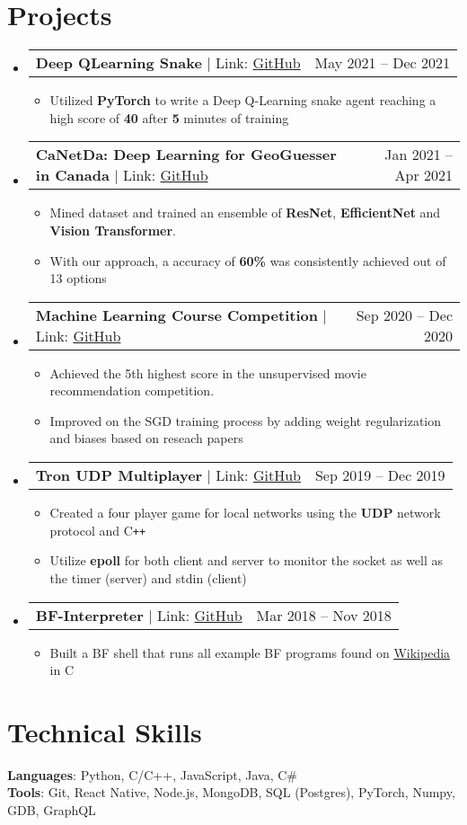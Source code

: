 \documentclass[letterpaper,11pt]{article}
\makeatletter
\newcommand{\resumeItem}[1]{
  \item\small{
    {#1 \vspace{-2pt}}
  }
}
\newcommand{\resumeProjectHeading}[2]{
    \item
    \begin{tabular*}{0.97\textwidth}{l@{\extracolsep{\fill}}r}
      \small#1 & #2 \\
    \end{tabular*}\vspace{-7pt}
}
\newcommand{\resumeSubHeadingListStart}{\begin{itemize}[leftmargin=0.15in, label={}]}
\newcommand{\resumeSubHeadingListEnd}{\end{itemize}}
\newcommand{\resumeItemListStart}{\begin{itemize}}
\newcommand{\resumeItemListEnd}{\end{itemize}\vspace{-7pt}}
\makeatother
\begin{document}
\section{Projects}
    \resumeSubHeadingListStart
      \resumeProjectHeading
        {\textbf{Deep QLearning Snake} $|$ Link: \href{https://github.com/JaLnYn/pokerbot}{GitHub}}{May 2021 -- Dec 2021}
        \resumeItemListStart
          \resumeItem{Utilized \textbf{PyTorch} to write a Deep Q-Learning snake agent reaching a high score of \textbf{40} after \textbf{5} minutes of training}
        \resumeItemListEnd
        \resumeProjectHeading
          {\textbf{CaNetDa: Deep Learning for GeoGuesser in Canada} $|$ Link: \href{https://github.com/st-tran/CSC413-Project}{GitHub}}{Jan 2021 -- Apr 2021}
          \resumeItemListStart
            \resumeItem{Mined dataset and trained an ensemble of \textbf{ResNet}, \textbf{EfficientNet} and \textbf{Vision Transformer}.}
            \resumeItem{With our approach, a accuracy of \textbf{60\%} was consistently achieved out of 13 options}
          \resumeItemListEnd
      \resumeProjectHeading
          {\textbf{Machine Learning Course Competition} $|$ Link: \href{https://github.com/JaLnYn/csc311_final_project/tree/main/project/starter_code}{GitHub}}{Sep 2020 -- Dec 2020}
          \resumeItemListStart
            \resumeItem{Achieved the 5th highest score in the unsupervised movie recommendation competition.}
            \resumeItem{Improved on the SGD training process by adding weight regularization and biases based on reseach papers}
          \resumeItemListEnd
      \resumeProjectHeading
        {\textbf{Tron UDP Multiplayer} $|$ Link: \href{https://github.com/JaLnYn/Tron}{GitHub}}{Sep 2019 -- Dec 2019}
        \resumeItemListStart
          \resumeItem{Created a four player game for local networks using the \textbf{UDP} network protocol and C\texttt{++}}
          \resumeItem{Utilize \textbf{epoll} for both client and server to monitor the socket as well as the timer (server) and stdin (client)}
        \resumeItemListEnd
      \resumeProjectHeading
        {\textbf{BF-Interpreter} $|$ Link: \href{https://github.com/JaLnYn/Bf-interpreter}{GitHub}}{Mar 2018 -- Nov 2018}
        \resumeItemListStart
          \resumeItem{Built a BF shell that runs all example BF programs found on \href{https://en.wikipedia.org/wiki/Esoteric_programming_language\#Binary_lambda_calculus}{\underline{Wikipedia}} in C}
        \resumeItemListEnd
    \resumeSubHeadingListEnd
%
\section{Technical Skills}
 \begin{itemize}[leftmargin=0.15in, label={}]
    \small{\item{
     \textbf{Languages}{: Python, C/C++, JavaScript, Java, C\#} \\
     \textbf{Tools}{: Git, React Native, Node.js, MongoDB, SQL (Postgres), PyTorch, Numpy, GDB, GraphQL} \\
    }}
 \end{itemize}


\end{document}
